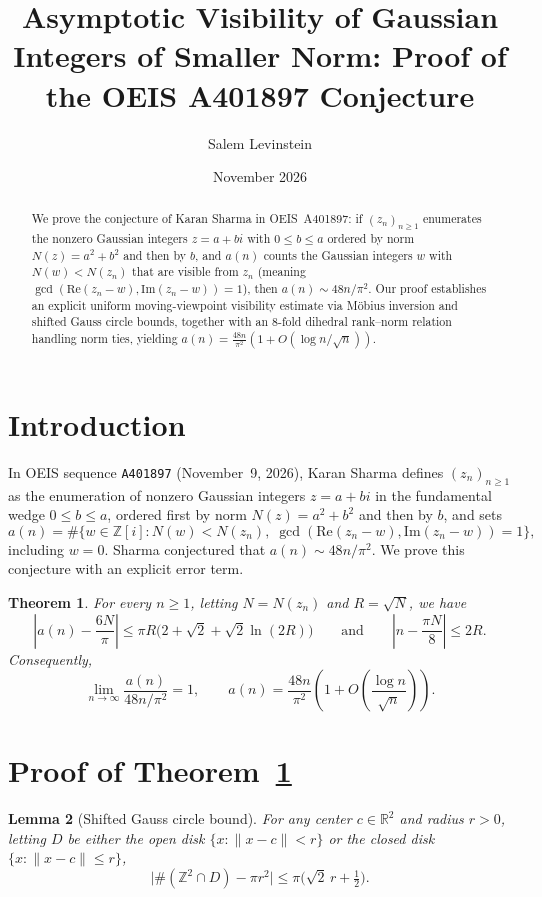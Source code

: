 \documentclass[11pt]{article}
\title{Asymptotic Visibility of Gaussian Integers of Smaller Norm: Proof of the OEIS A401897 Conjecture}
\author{Salem Levinstein}
\date{November 2026}
\newtheorem{theorem}{Theorem}
\newtheorem{lemma}[theorem]{Lemma}
\begin{document}
\maketitle

\begin{abstract}
We prove the conjecture of Karan Sharma in OEIS~A401897: if $(z_n)_{n \ge 1}$
enumerates the nonzero Gaussian integers $z = a + bi$ with $0 \le b \le a$
ordered by norm $N(z) = a^2 + b^2$ and then by $b$, and $a(n)$ counts the
Gaussian integers $w$ with $N(w) < N(z_n)$ that are visible from $z_n$
(meaning $\gcd(\mathrm{Re}(z_n - w), \mathrm{Im}(z_n - w)) = 1$), then
$a(n) \sim 48n/\pi^2$. Our proof establishes an explicit uniform moving-viewpoint
visibility estimate via M\"obius inversion and shifted Gauss circle bounds,
together with an $8$-fold dihedral rank--norm relation handling norm ties,
yielding $a(n) = \frac{48n}{\pi^2}(1 + O(\log n / \sqrt{n}))$.
\end{abstract}

\section{Introduction}

In OEIS sequence \texttt{A401897} (November~9, 2026), Karan Sharma defines
$(z_n)_{n \ge 1}$ as the enumeration of nonzero Gaussian integers $z = a + bi$
in the fundamental wedge $0 \le b \le a$, ordered first by norm
$N(z) = a^2 + b^2$ and then by $b$, and sets
\[
a(n) = \#\bigl\{w \in \mathbb{Z}[i] : N(w) < N(z_n),\;
  \gcd(\mathrm{Re}(z_n - w), \mathrm{Im}(z_n - w)) = 1\bigr\},
\]
including $w = 0$. Sharma conjectured that $a(n) \sim 48n/\pi^2$. We prove this
conjecture with an explicit error term.

\begin{theorem}\label{thm:main}
For every $n \ge 1$, letting $N = N(z_n)$ and $R = \sqrt{N}$, we have
\[
\left|a(n) - \frac{6N}{\pi}\right| \le \pi R\bigl(2 + \sqrt{2} + \sqrt{2}\ln(2R)\bigr)
\qquad\text{and}\qquad
\left|n - \frac{\pi N}{8}\right| \le 2R.
\]
Consequently,
\[
\lim_{n \to \infty} \frac{a(n)}{48n/\pi^2} = 1,
\qquad
a(n) = \frac{48n}{\pi^2}\left(1 + O\!\left(\frac{\log n}{\sqrt{n}}\right)\right).
\]
\end{theorem}

\section{Proof of Theorem~\ref{thm:main}}

\begin{lemma}[Shifted Gauss circle bound]\label{lem:gauss}
For any center $c \in \mathbb{R}^2$ and radius $r > 0$, letting $D$ be either
the open disk $\{x : \|x - c\| < r\}$ or the closed disk $\{x : \|x - c\| \le r\}$,
\[
\bigl|\#(\mathbb{Z}^2 \cap D) - \pi r^2\bigr| \le \pi\bigl(\sqrt{2}\,r + \tfrac{1}{2}\bigr).
\]
\end{lemma}
\end{document}

